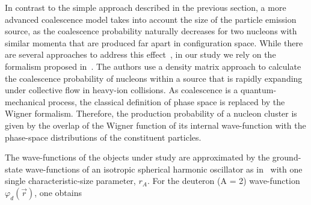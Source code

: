 In contrast to the simple approach described in the previous section, a more advanced coalescence model takes into account the size of the particle emission source, as the coalescence probability naturally decreases for two nucleons with similar momenta that are produced far apart in configuration space. While there are several approaches to address this effect~\cite{Sato:1981ez, Nagle:1996vp}, in our study we rely on the formalism proposed in~\cite{Scheibl:1998tk}.
The authors use a density matrix approach to calculate the coalescence probability of nucleons within a source that is rapidly expanding under collective flow in heavy-ion collisions.
As coalescence is a quantum-mechanical process, the classical definition of phase space is replaced by the Wigner formalism. Therefore, the production probability of a nucleon cluster is given by the overlap of the Wigner function of its internal wave-function with the phase-space distributions of the constituent particles.

The wave-functions of the objects under study are approximated by the ground-state wave-functions of an isotropic spherical harmonic oscillator as in~\cite{Scheibl:1998tk} with one single characteristic-size parameter, $r_{A}$. 
For the deuteron (A = 2) wave-function $\varphi_{d}(\vec{r}) $, one obtains

